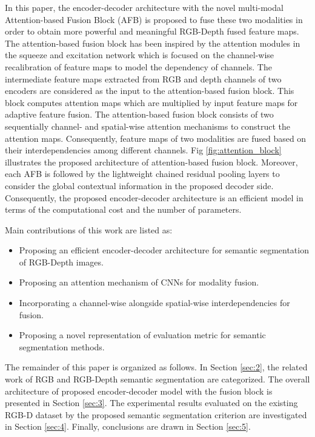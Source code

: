 \documentclass[journal,transmag]{IEEEtran}
\begin{document}
In this paper, the encoder-decoder architecture with the novel multi-modal Attention-based Fusion Block (AFB) is proposed to fuse these two modalities in order to obtain  more powerful and meaningful RGB-Depth fused feature maps.  The  attention-based fusion block has been inspired by the attention modules in the squeeze and excitation network \cite{hu2018squeeze} which is focused on the channel-wise recalibration of feature maps to model the dependency of channels.  The intermediate feature maps extracted from RGB and depth channels of two encoders are considered as the input to the attention-based fusion block. This block computes attention maps which are multiplied by input feature maps for adaptive feature fusion. The attention-based fusion block consists of two sequentially channel- and spatial-wise attention mechanisms to construct the attention maps. Consequently,  feature maps of two modalities are fused based on their interdependencies among different channels. Fig \ref{fig:attention_block} illustrates the proposed architecture of attention-based fusion block.  Moreover, each AFB is followed by the lightweight chained residual pooling layers to consider the global contextual information in the proposed decoder side. Consequently, the proposed encoder-decoder architecture is an efficient model in terms of the computational cost and the number of parameters.

Main contributions of this work are listed as:
\begin{itemize}
	\item Proposing an efficient encoder-decoder architecture for semantic segmentation of RGB-Depth images.  
	\item Proposing an attention mechanism of CNNs for modality fusion.
	\item Incorporating a channel-wise alongside spatial-wise interdependencies for fusion.
	\item Proposing a novel representation of evaluation metric for semantic segmentation methods.
\end{itemize}
The remainder of this paper is organized as follows. In Section \ref{sec:2}, the related work of RGB and RGB-Depth semantic segmentation are categorized. The overall architecture of proposed encoder-decoder model with the fusion block is presented in Section \ref{sec:3}. The experimental results evaluated on the existing RGB-D dataset by the proposed semantic segmentation criterion are investigated in Section \ref{sec:4}. Finally, conclusions are drawn in Section \ref{sec:5}.    
\end{document}
